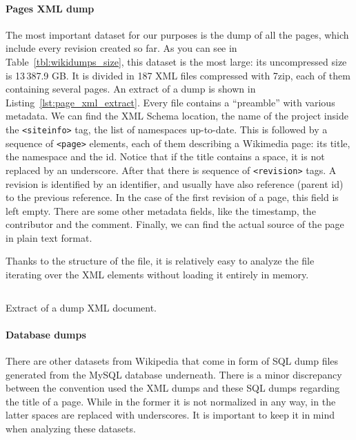 \paragraph{Pages XML dump}
The most important dataset for our purposes is the dump of all the pages, which include every revision created so far.
As you can see in Table~\ref{tbl:wikidumps_size}, this dataset is the most large: its uncompressed size is 13\,387.9 GB\@.
It is divided in 187 XML files compressed with 7zip, each of them containing several pages.
An extract of a dump is shown in Listing~\ref{lst:page_xml_extract}.
Every file contains a ``preamble'' with various metadata.
We can find the XML Schema location, the name of the project inside the \texttt{<siteinfo>} tag, the list of namespaces up-to-date.
This is followed by a sequence of \texttt{<page>} elements, each of them describing a Wikimedia page: its title, the namespace and the id.
Notice that if the title contains a space, it is not replaced by an underscore.
After that there is sequence of \texttt{<revision>} tags.
A revision is identified by an identifier, and usually have also reference (parent id) to the previous reference.
In the case of the first revision of a page, this field is left empty.
There are some other metadata fields, like the timestamp, the contributor and the comment.
Finally, we can find the actual source of the page in plain text format.

Thanks to the structure of the file, it is relatively easy to analyze the file iterating over the XML elements without loading it entirely in memory.

\begin{listing}[]
    \inputminted[breaklines=true]{xml}{assets/page_xml_extract.xml}
    \caption{Extract of a dump XML document.}
    \label{lst:page_xml_extract}
\end{listing}

\paragraph{Database dumps}
There are other datasets from Wikipedia that come in form of SQL dump files generated from the MySQL database underneath.
There is a minor discrepancy between the convention used the XML dumps and these SQL dumps regarding the title of a page.
While in the former it is not normalized in any way, in the latter spaces are replaced with underscores.
It is important to keep it in mind when analyzing these datasets.

